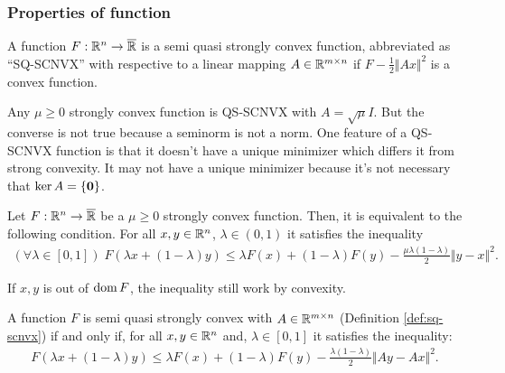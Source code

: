 \documentclass[12pt]{article}
\begin{document}
        \subsubsection{Properties of function}
            \begin{definition}\label{def:sq-scnvx}
                A function $F: \mathbb R^n \rightarrow \overline {\mathbb R}$ is a semi quasi strongly convex function, abbreviated as ``SQ-SCNVX'' with respective to a linear mapping $A \in \mathbb R^{m \times n}$ if $F - \frac{1}{2}\Vert Ax\Vert^2$ is a convex function. 
            \end{definition}
            \begin{remark}
                Any $\mu \ge 0$ strongly convex function is QS-SCNVX with $A = \sqrt{\mu}I$. 
                But the converse is not true because a seminorm is not a norm. 
                One feature of a QS-SCNVX function is that it doesn't have a unique minimizer which differs it from strong convexity. 
                It may not have a unique minimizer because it's not necessary that $\operatorname{ker} A = \{\mathbf 0\}$. 
            \end{remark}
            \begin{theorem}\label{thm:jesen}
                Let $F: \mathbb R^n \rightarrow \overline {\mathbb R}$ be a $\mu \ge 0$ strongly convex function. 
                Then, it is equivalent to the following condition. 
                For all $x, y \in \mathbb R^n$, $\lambda \in (0, 1)$ it satisfies the inequality 
                \begin{align*}
                    (\forall \lambda \in [0, 1])\; 
                    F(\lambda x + (1 - \lambda)y) \le \lambda F(x) + (1 - \lambda)F(y) -\frac{\mu\lambda(1 - \lambda)}{2} \Vert y - x\Vert^2. 
                \end{align*}
            \end{theorem}
            \begin{remark}
                If $x, y$ is out of $\operatorname{dom} F$, the inequality still work by convexity. 
            \end{remark}
            \begin{theorem}\label{thm:sq-scnvx-equiv}
                A function $F$ is semi quasi strongly convex with $A \in \mathbb R^{m \times n}$ (Definition \ref{def:sq-scnvx}) if and only if, for all $x, y \in \mathbb R^n$ and, $\lambda \in [0, 1]$ it satisfies the inequality: 
                \begin{align*}
                    F(\lambda x + (1 - \lambda)y) \le \lambda F(x) + (1 - \lambda)F(y) -\frac{\lambda(1 - \lambda)}{2} \Vert Ay - Ax\Vert^2. 
                \end{align*}
            \end{theorem}
\end{document}

